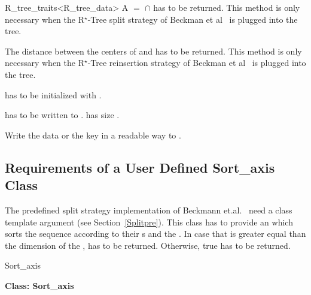 \begin{ccClassTemplate}{R_tree_traits<R_tree_data>}
{A $=$  $\cap$  has to be returned.
 This method is only
  necessary when the R$^\star$-Tree split strategy of Beckman et
  al~\cite{Beckmann:1990:RER} is plugged into the tree.}

{The distance between the centers of  and  has to
  be returned.
This method is only
  necessary when the R$^\star$-Tree reinsertion strategy of Beckman et
  al~\cite{Beckmann:1990:RER} is plugged into the tree.}

{ has to be initialized with .}

{ has to be  written to .  has size .}

{Write the data or the key in a readable way to .}

\end{ccClassTemplate}
\subsection{Requirements of a User Defined Sort\_axis Class}
\label{Sortuser}
The predefined split strategy implementation of
Beckmann et.al.~\cite{Beckmann:1990:RER} need a 
 class template argument (see Section~\ref{Splitpre}). This class has to
provide  an  which sorts the
sequence \ccc{[first,last[} according to their s and the
. In
case that  is greater equal than the dimension of
the ,  has to be  returned. Otherwise, true
has to be returned.


\begin{ccClass}{Sort_axis}

\noindent
{\bf Class: Sort\_axis}


\ccOperations
{}
\end{ccClass}

